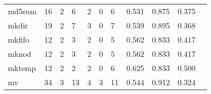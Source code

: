\begin{longtable}{lp{1.20cm}p{1.20cm}p{1.20cm}p{1.20cm}p{1.20cm}p{1.20cm}p{1.20cm}p{1.20cm}p{1.20cm}p{1.20cm}}
md5sum    &                                    16 &                                                  2 &                                                  6 &                                                  2 &                                                  0 &                                                  6 &                                         0.531 &                                              0.875 &                                              0.375 \\
mkdir     &                                    19 &                                                  2 &                                                  7 &                                                  3 &                                                  0 &                                                  7 &                                         0.539 &                                              0.895 &                                              0.368 \\
mkfifo    &                                    12 &                                                  2 &                                                  3 &                                                  2 &                                                  0 &                                                  5 &                                         0.562 &                                              0.833 &                                              0.417 \\
mknod     &                                    12 &                                                  2 &                                                  3 &                                                  2 &                                                  0 &                                                  5 &                                         0.562 &                                              0.833 &                                              0.417 \\
mktemp    &                                    12 &                                                  2 &                                                  2 &                                                  2 &                                                  0 &                                                  6 &                                         0.625 &                                              0.833 &                                              0.500 \\
mv        &                                    34 &                                                  3 &                                                 13 &                                                  4 &                                                  3 &                                                 11 &                                         0.544 &                                              0.912 &                                              0.324 \\

\end{longtable}
